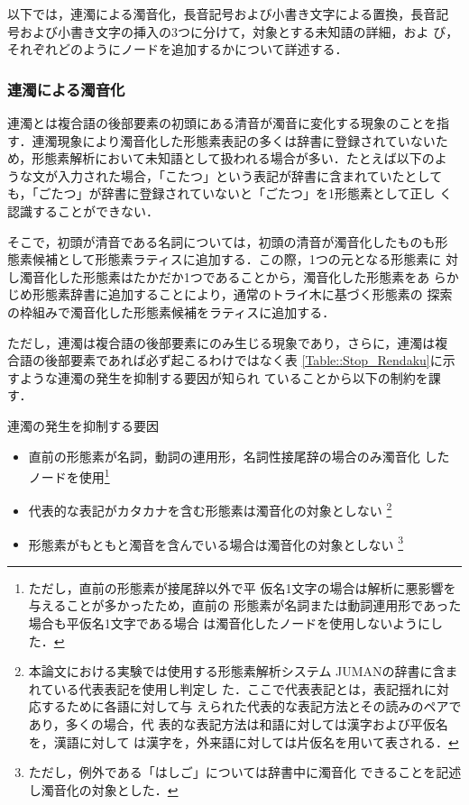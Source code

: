 \documentclass[japanese]{jnlp_1.4}
\begin{document}
   以下では，連濁による濁音化，長音記号および小書き文字による置換，長音記
   号および小書き文字の挿入の3つに分けて，対象とする未知語の詳細，およ
   び，それぞれどのようにノードを追加するかについて詳述する．


   \subsubsection{連濁による濁音化}

   連濁とは複合語の後部要素の初頭にある清音が濁音に変化する現象のことを指
   す．連濁現象により濁音化した形態素表記の多くは辞書に登録されていないた
   め，形態素解析において未知語として扱われる場合が多い．たとえば以下のよ
   うな文が入力された場合，「こたつ」という表記が辞書に含まれていたとして
   も，「ごたつ」が辞書に登録されていないと「ごたつ」を1形態素として正し
   く認識することができない．

\begin{exe}
\end{exe}

   そこで，初頭が清音である名詞については，初頭の清音が濁音化したものも形
   態素候補として形態素ラティスに追加する．この際，1つの元となる形態素に
   対し濁音化した形態素はたかだか1つであることから，濁音化した形態素をあ
   らかじめ形態素辞書に追加することにより，通常のトライ木に基づく形態素の
   探索の枠組みで濁音化した形態素候補をラティスに追加する．

   ただし，連濁は複合語の後部要素にのみ生じる現象であり，さらに，連濁は複
   合語の後部要素であれば必ず起こるわけではなく表
   \ref{Table::Stop_Rendaku}に示すような連濁の発生を抑制する要因が知られ
   ていることから以下の制約を課す．

   \begin{table}[b]
    \caption{連濁の発生を抑制する要因}
\label{Table::Stop_Rendaku}

\end{table}

   \begin{itemize}
    \item 直前の形態素が名詞，動詞の連用形，名詞性接尾辞の場合のみ濁音化
	  したノードを使用\footnote{ただし，直前の形態素が接尾辞以外で平
	  仮名1文字の場合は解析に悪影響を与えることが多かったため，直前の
	  形態素が名詞または動詞連用形であった場合も平仮名1文字である場合
	  は濁音化したノードを使用しないようにした．}
    \item 代表的な表記がカタカナを含む形態素は濁音化の対象としない
	  \footnote{本論文における実験では使用する形態素解析システム
	  JUMANの辞書に含まれている代表表記\cite{Okabe2007}を使用し判定し
	  た．ここで代表表記とは，表記揺れに対応するために各語に対して与
	  えられた代表的な表記方法とその読みのペアであり，多くの場合，代
	  表的な表記方法は和語に対しては漢字および平仮名を，漢語に対して
	  は漢字を，外来語に対しては片仮名を用いて表される．}
    \item 形態素がもともと濁音を含んでいる場合は濁音化の対象としない
	  \footnote{ただし，例外である「はしご」については辞書中に濁音化
	  できることを記述し濁音化の対象とした．}
   \end{itemize}
\end{document}
